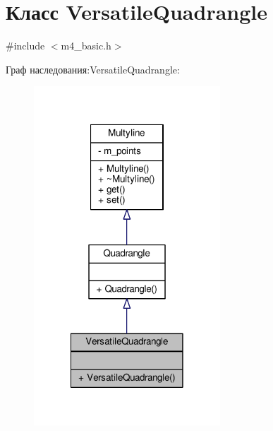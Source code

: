 \hypertarget{class_versatile_quadrangle}{\section{Класс Versatile\-Quadrangle}
\label{class_versatile_quadrangle}
}


{\ttfamily \#include $<$m4\-\_\-basic.\-h$>$}



Граф наследования\-:Versatile\-Quadrangle\-:
\nopagebreak
\begin{figure}[H]
\begin{center}
\leavevmode
\includegraphics[width=198pt]{class_versatile_quadrangle__inherit__graph}
\end{center}
\end{figure}


